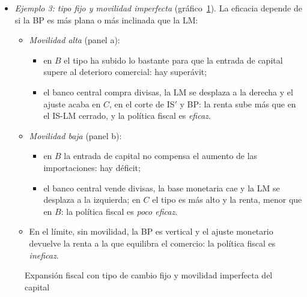 \documentclass[11pt]{article}
\begin{document}
\begin{itemize}
\item \emph{Ejemplo 3: tipo fijo y movilidad imperfecta} (gráfico~\ref{fig:mf-fijo-imperfecta}). La eficacia depende de si la BP es más plana o más inclinada que la LM:
  \begin{itemize}
  \item \emph{Movilidad alta} (panel a):
    \begin{itemize}
    \item en $B$ el tipo ha subido lo bastante para que la entrada de capital supere al deterioro comercial: hay superávit;
    \item el banco central compra divisas, la LM se desplaza a la derecha y el ajuste acaba en $C$, en el corte de IS$'$ y BP: la renta sube más que en el IS-LM cerrado, y la política fiscal es \emph{eficaz}.
    \end{itemize}
  \item \emph{Movilidad baja} (panel b):
    \begin{itemize}
    \item en $B$ la entrada de capital no compensa el aumento de las importaciones: hay déficit;
    \item el banco central vende divisas, la base monetaria cae y la LM se desplaza a la izquierda; en $C$ el tipo es más alto y la renta, menor que en $B$: la política fiscal es \emph{poco eficaz}.
    \end{itemize}
  \item En el límite, sin movilidad, la BP es vertical y el ajuste monetario devuelve la renta a la que equilibra el comercio: la política fiscal es \emph{ineficaz}.
  \end{itemize}
\end{itemize}

\begin{figure}[H]
\centering
\caption{Expansión fiscal con tipo de cambio fijo y movilidad imperfecta del capital}\label{fig:mf-fijo-imperfecta}
\end{figure}
\end{document}
